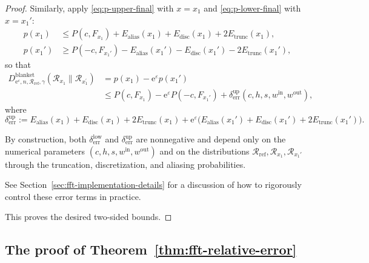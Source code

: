 \documentclass{article}
\theoremstyle{plain}
\theoremstyle{definition}
\begin{document}
\begin{proof}
Similarly, apply \eqref{eq:p-upper-final} with $x=x_1$ and \eqref{eq:p-lower-final} with $x=x_1'$:
\begin{align*}
  p(x_1)
  &\le
  P(c,F_{x_1})
  + E_{\mathrm{alias}}(x_1)
  + E_{\mathrm{disc}}(x_1)
  + 2E_{\mathrm{trunc}}(x_1), \\
  p(x_1')
  &\ge
  P(-c,F_{x_1'})
  - E_{\mathrm{alias}}(x_1')
  - E_{\mathrm{disc}}(x_1')
  - 2E_{\mathrm{trunc}}(x_1'),
\end{align*}
so that
\begin{align*}
  D_{\mathrm{e}^\varepsilon,n,\mathcal{R}_\mathrm{ref},\gamma}^\mathrm{blanket}(\mathcal{R}_{x_1} \| \mathcal{R}_{x_1^\prime})
  &= p(x_1) - \mathrm e^\varepsilon p(x_1') \\
  &\le
  P(c,F_{x_1}) - \mathrm e^\varepsilon P(-c,F_{x_1'})
  + \delta_{\mathrm{err}}^{\mathrm{up}}(c,h,s,w^{\mathrm{in}},w^{\mathrm{out}}),
\end{align*}
where
\[
  \delta_{\mathrm{err}}^{\mathrm{up}}
  :=
  E_{\mathrm{alias}}(x_1)
  + E_{\mathrm{disc}}(x_1)
  + 2E_{\mathrm{trunc}}(x_1)
  + \mathrm e^\varepsilon\bigl(
    E_{\mathrm{alias}}(x_1')
    + E_{\mathrm{disc}}(x_1')
    + 2E_{\mathrm{trunc}}(x_1')
  \bigr).
\]

By construction, both $\delta_{\mathrm{err}}^{\mathrm{low}}$ and
$\delta_{\mathrm{err}}^{\mathrm{up}}$ are nonnegative and depend only on the numerical
parameters $(c,h,s,w^{\mathrm{in}},w^{\mathrm{out}})$ and on the distributions
$\mathcal R_{\mathrm{ref}},\mathcal R_{x_1},\mathcal R_{x_1'}$ through the truncation,
discretization, and aliasing probabilities.


See Section~\ref{sec:fft-implementation-details} for a discussion of how to rigorously control these error terms in practice.


This proves the desired two-sided bounds.
\end{proof}


\subsection{The proof of Theorem~\ref{thm:fft-relative-error}}
\label{app:proof-fft-relative-error}

\fftrelativeerror*
\end{document}
